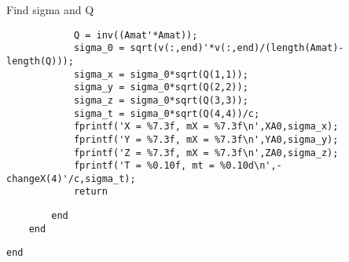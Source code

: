 \begin{par}
Find sigma and Q
\end{par} \vspace{1em}
\begin{verbatim}
            Q = inv((Amat'*Amat));
            sigma_0 = sqrt(v(:,end)'*v(:,end)/(length(Amat)-length(Q)));
            sigma_x = sigma_0*sqrt(Q(1,1));
            sigma_y = sigma_0*sqrt(Q(2,2));
            sigma_z = sigma_0*sqrt(Q(3,3));
            sigma_t = sigma_0*sqrt(Q(4,4))/c;
            fprintf('X = %7.3f, mX = %7.3f\n',XA0,sigma_x);
            fprintf('Y = %7.3f, mX = %7.3f\n',YA0,sigma_y);
            fprintf('Z = %7.3f, mX = %7.3f\n',ZA0,sigma_z);
            fprintf('T = %0.10f, mt = %0.10d\n',-changeX(4)'/c,sigma_t);
            return
\end{verbatim}
\color{black}
    \begin{verbatim}
        end
    end
\end{verbatim}
\begin{verbatim}
end
\end{verbatim}